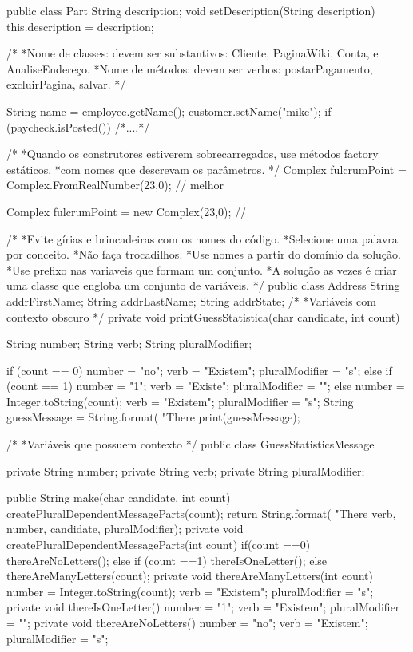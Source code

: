 public class Part{
	String description;
	void setDescription(String description){
		this.description = description;
	}
}

/*
*Nome de classes: devem ser substantivos: Cliente, PaginaWiki, Conta, e AnaliseEndereço.
*Nome de métodos: devem ser verbos: postarPagamento, excluirPagina, salvar. 
*/

String name = employee.getName();
customer.setName("mike");
if (paycheck.isPosted()){
	/*....*/
}

/*
*Quando os construtores estiverem sobrecarregados, use métodos factory estáticos,
*com nomes que descrevam os parâmetros. 
*/
Complex fulcrumPoint = Complex.FromRealNumber(23,0); // melhor

Complex fulcrumPoint = new Complex(23,0); //

/*
*Evite gírias e brincadeiras com os nomes do código.
*Selecione uma palavra por conceito.
*Não faça trocadilhos.
*Use nomes a partir do domínio da solução.
*Use prefixo nas variaveis que formam um conjunto.
*A solução as vezes é criar uma classe que engloba um conjunto de variáveis.
*/
public class Address{
	String addrFirstName;
	String addrLastName;
	String addrState;
}
/*
*Variáveis com contexto obscuro
*/
private void printGuessStatistica(char candidate, int count){
	String number;
	String verb;
	String pluralModifier;
	
	if (count == 0){
		number = "no";
		verb = "Existem";
		pluralModifier = "s";
	}else if (count == 1){
		number = "1";
		verb = "Existe";
		pluralModifier = "";
	}else {
		number = Integer.toString(count);
		verb = "Existem";
		pluralModifier = "s";
	}
	String guessMessage = String.format(
	"There %
	print(guessMessage);
}
/*
*Variáveis que possuem contexto
*/
public class GuessStatisticsMessage{
	private String number;
	private String verb;
	private String pluralModifier;
	
	public String make(char candidate, int count){
		createPluralDependentMessageParts(count);
		return String.format(
		"There %
		verb, number, candidate, pluralModifier);		
	}
	private void createPluralDependentMessageParts(int count){
		if(count ==0){
			thereAreNoLetters();
		}else if (count ==1){
			thereIsOneLetter();
		}else {
			thereAreManyLetters(count);
		}
	}
	private void thereAreManyLetters(int count){
		number = Integer.toString(count);
		verb = "Existem";
		pluralModifier = "s";
	}
	private void thereIsOneLetter(){
		number = "1";
		verb = "Existem";
		pluralModifier = "";
	}
	private void thereAreNoLetters(){
		number = "no";
		verb = "Existem";
		pluralModifier = "s";
	}
	
}
 
